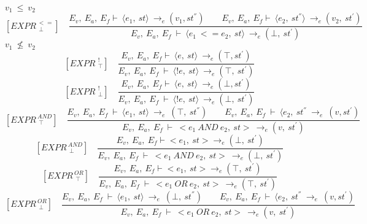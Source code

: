 	\begin{math}		
		v_1 \ \le \ v_2		
	\end{math} 
	\[	
	[EXPR^{\ <=}_{\ \ \bot}] \quad	
	\dfrac{E_v, \ E_a, \ E_f \vdash \ \langle e_1, \ st \rangle \ \rightarrow_e (v_1, st^{''}) \qquad E_v, \ E_a, \ E_f \vdash \ \langle e_2, \ st^{''} \rangle \ \rightarrow_e (v_2, \ st^{'})}{E_v, \ E_a, \ E_f \ \vdash \ \langle e_1 \ <= e_2, \ st \rangle \ \rightarrow_e (\bot, \ st^{'})}	
	\]
	\begin{math}		
		v_1 \ \nleq \ v_2		
	\end{math}
	\[	
	[EXPR^{\ \ !}_{\ \ \top}] \quad	
	\dfrac{E_v, \ E_a, \ E_f \vdash \ \langle e, \ st \rangle \ \rightarrow_e (\top, st^{'})}{E_v, \ E_a, \ E_f \ \vdash \ \langle !e, \ st \rangle \ \rightarrow_e (\top, \ st^{'})}	
	\] \newline
	\[	
	[EXPR^{\ \ !}_{\ \ \bot}] \quad	
	\dfrac{E_v, \ E_a, \ E_f \vdash \ \langle e, \ st \rangle \ \rightarrow_e (\bot, st^{'})}{E_v, \ E_a, \ E_f \ \vdash \ \langle !e, \ st \rangle \ \rightarrow_e (\bot, \ st^{'})}	
	\]\newline
	\[	
	[EXPR^{\ AND}_{\ \ \top}] \quad	
	\dfrac{E_v, \ E_a, \ E_f \ \vdash \ \langle e_1, \ st \rangle \ \rightarrow_e \ (\top, \ st^{''}) \qquad E_v, \ E_a, \ E_f \ \vdash \ \langle e_2, \ st^{''} \ \rightarrow_e \ (v, st^{'})}{E_v, \ E_a, \ E_f \ \vdash \ <e_1 \ AND \ e_2, \ st> \ \rightarrow_e (v, \ st^{'})}	
	\] \newline
	\[	
	[EXPR^{\ AND}_{\ \ \bot}] \quad	
	\dfrac{E_v, \ E_a, \ E_f \vdash <e_1, \ st> \rightarrow_e (\bot, \ st^{'}) }{E_v, \ E_a, \ E_f \ \vdash \ <e_1 \ AND \ e_2, \ st> \ \rightarrow_e (\bot, \ st^{'})}	
	\]\newline
	\[	
	[EXPR^{\ OR}_{\ \ \top}] \quad	
	\dfrac{E_v, \ E_a, \ E_f \vdash <e_1, \ st> \rightarrow_e (\top, \ st^{'}) }{E_v, \ E_a, \ E_f \ \vdash \ <e_1 \ OR \ e_2, \ st> \ \rightarrow_e (\top, \ st^{'})}	
	\]\newline
	\[	
	[EXPR^{\ OR}_{\ \ \bot}] \quad	
	\dfrac{E_v, \ E_a, \ E_f \ \vdash \ \langle e_1, \ st \rangle \ \rightarrow_e \ (\bot, \ st^{''}) \qquad E_v, \ E_a, \ E_f \ \vdash \ \langle e_2, \ st^{''} \ \rightarrow_e \ (v, st^{'})}{E_v, \ E_a, \ E_f \ \vdash \ <e_1 \ OR \ e_2, \ st> \ \rightarrow_e (v, \ st^{'})}
	\]